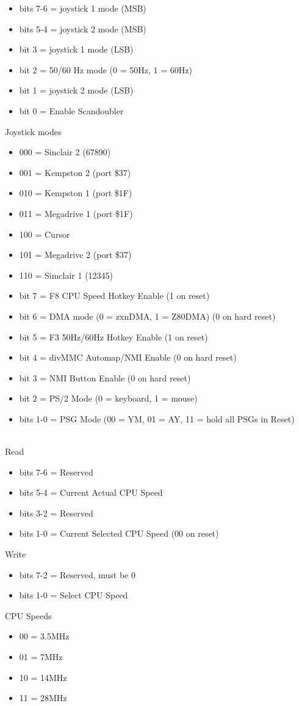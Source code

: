 \begin{itemize}
\item bits 7-6 = joystick 1 mode (MSB)
\item bits 5-4 = joystick 2 mode (MSB)
\item bit 3 = joystick 1 mode (LSB)
\item bit 2 = 50/60 Hz mode (0 = 50Hz, 1 = 60Hz)
\item bit 1 = joystick 2 mode (LSB)
\item bit 0 = Enable Scandoubler
\end{itemize}
Joystick modes
\begin{itemize}
\item 000 = Sinclair 2 (67890)
\item 001 = Kempston 2 (port \$37)
\item 010 = Kempston 1 (port \$1F)
\item 011 = Megadrive 1 (port \$1F)
\item 100 = Cursor
\item 101 = Megadrive 2 (port \$37)
\item 110 = Simclair 1 (12345)
\end{itemize}

\begin{itemize}
\item bit 7 = F8 CPU Speed Hotkey Enable (1 on reset)
\item bit 6 = DMA mode (0 = zxnDMA, 1 = Z80DMA) (0 on hard reset)
\item bit 5 = F3 50Hz/60Hz Hotkey Enable (1 on reset)
\item bit 4 = divMMC Automap/NMI Enable (0 on hard reset)
\item bit 3 = NMI Button Enable (0 on hard reset)
\item bit 2 = PS/2 Mode (0 = keyboard, 1 = mouse)
\item bits 1-0 = PSG Mode (00 = YM, 01 = AY, 11 = hold all PSGs in Reset)
\end{itemize}

\\
Read
\begin{itemize}
\item bits 7-6 = Reserved
\item bits 5-4 = Current Actual CPU Speed
\item bits 3-2 = Reserved
\item bits 1-0 = Current Selected CPU Speed (00 on reset)
\end{itemize}
Write
\begin{itemize}
\item bits 7-2 = Reserved, must be 0
\item bits 1-0 = Select CPU Speed
\end{itemize}
CPU Speeds
\begin{itemize}
\item 00 = 3.5MHz
\item 01 = 7MHz
\item 10 = 14MHz
\item 11 = 28MHz
\end{itemize}

